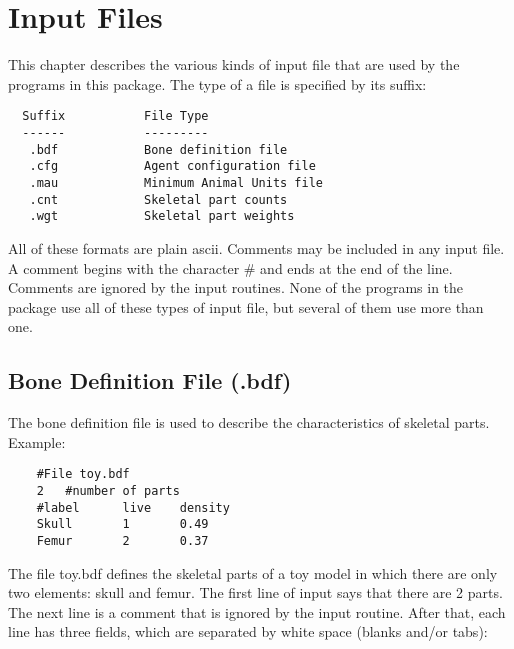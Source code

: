 
\chapter{Input Files\label{ch.files}}%

This chapter describes the various kinds of input file that are used by the
programs in this package.  The type of a file is specified by its suffix:
\begin{verbatim}
  Suffix           File Type
  ------           ---------
   .bdf            Bone definition file
   .cfg            Agent configuration file
   .mau            Minimum Animal Units file
   .cnt            Skeletal part counts
   .wgt            Skeletal part weights
\end{verbatim}
All of these formats are plain ascii.  Comments may be included in any
input file.  A comment begins with the character \# and ends at the end
of the line.  Comments are ignored by the input routines.  None of the
programs in the package use all of these types of input file, but
several of them use more than one.

\section{Bone Definition File (.bdf)\label{sec.bdf}}%

The bone definition file is used to describe the characteristics of
skeletal parts.  Example:
\begin{verbatim}
    #File toy.bdf
    2   #number of parts
    #label      live    density
    Skull       1       0.49
    Femur       2       0.37
\end{verbatim}

The file toy.bdf defines the skeletal parts of a toy model in which
there are only two elements: skull and femur.  The first line of input
says that there are 2 parts.  The next line is a comment that is
ignored by the input routine.  After that, each line has three fields,
which are separated by white space (blanks and/or tabs):

